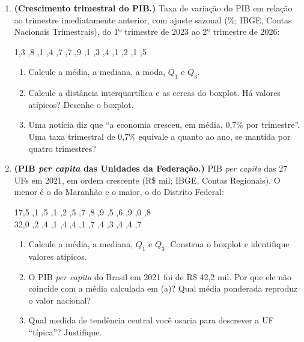 \documentclass[11pt]{article}
\begin{document}
\begin{enumerate}[label=\textbf{A\arabic*.}, leftmargin=*]
\item \textbf{(Crescimento trimestral do PIB.)} Taxa de variação do PIB em relação ao trimestre imediatamente anterior, com ajuste sazonal (\%;
IBGE, Contas Nacionais Trimestrais), do 1º trimestre de 2023 ao 2º trimestre de 2026:
\begin{center}
1,3 ,8 ,1 ,4 ,7 ,7 ,9 ,1 ,3 ,4 ,1 ,2 ,1 ,5
\end{center}
\begin{enumerate}[label=(\alph*)]
  \item Calcule a média, a mediana, a moda, $Q_1$ e $Q_3$.
  \item Calcule a distância interquartílica e as cercas do boxplot. Há valores atípicos? Desenhe o boxplot.
  \item Uma notícia diz que ``a economia cresceu, em média, 0,7\% por trimestre''. Uma taxa trimestral de 0,7\% equivale a quanto ao ano, se mantida por quatro trimestres?
\end{enumerate}

\item \textbf{(PIB \emph{per capita} das Unidades da Federação.)} PIB \emph{per capita} das 27 UFs em 2021, em ordem crescente (R\$ mil; IBGE, Contas Regionais).
O menor é o do Maranhão e o maior, o do Distrito Federal:
\begin{center}
\small
17,5 ,1 ,5 ,1 ,2 ,5 ,7 ,8 ,9 ,5 ,6 ,9 ,0 ,8 \\
32,0 ,2 ,4 ,1 ,4 ,4 ,1 ,7 ,4 ,3 ,4 ,4 ,7
\end{center}
\begin{enumerate}[label=(\alph*)]
  \item Calcule a média, a mediana, $Q_1$ e $Q_3$. Construa o boxplot e identifique valores atípicos.
  \item O PIB \emph{per capita} do Brasil em 2021 foi de R\$ 42,2 mil. Por que ele não coincide com a média calculada em (a)? Qual média
    ponderada reproduz o valor nacional?
  \item Qual medida de tendência central você usaria para descrever a UF ``típica''? Justifique.
\end{enumerate}

\end{enumerate}
\end{document}
